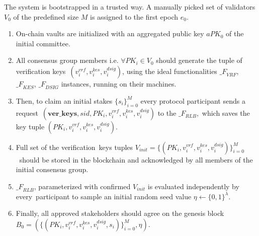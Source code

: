 The system is bootstrapped in a trusted way.
A manually picked set of validators $V_0$ of the predefined size $M$ is assigned to the first epoch $e_0$.
\begin{enumerate}
    \item On-chain vaults are initialized with an aggregated public key $aPK_0$ of the initial committee.

    \item All consensus group members i.e. $\forall PK_i \in V_0$ should generate the tuple of verification keys\
    ${(v_i^{vrf}, v_i^{kes}, v_i^{dsig})}$, using the ideal functionalities ${\mathcal_{F}}_{VRF}$,\
    ${\mathcal_{F}}_{KES}$, ${\mathcal_{F}}_{DSIG}$ instances, running on their machines.

    \item Then, to claim an initial stakes $\{s_i\}_{i=0}^M$ every protocol participant sends a request\
    ${(\textbf{ver\_keys}, sid, PK_i, v_i^{vrf}, v_i^{kes}, v_i^{dsig})}$ to the ${\mathcal_{F}}_{RLB}$,\
    which saves the key tuple ${(PK_i, v_i^{vrf}, v_i^{kes}, v_i^{dsig})}$.

    \item Full set of the verification\
    keys tuples ${V_{init} = \{(PK_i, v_i^{vrf}, v_i^{kes}, v_i^{dsig})\}_{i=0}^M}$\
    should be stored in the blockchain and acknowledged by all members of the initial consensus group.

    \item ${\mathcal_{F}}_{RLB}$, parameterized with confirmed $V_{init}$ is evaluated independently by every\
    participant to sample an initial random seed value $\eta \leftarrow \{0, 1\}^\lambda$.

    \item Finally, all approved stakeholders should agree on the genesis block\
    ${B_0=\left(\{(PK_i, v_i^{vrf}, v_i^{kes}, v_i^{dsig}, s_i)\}_{i=0}^M, \eta\right)}$.
\end{enumerate}

